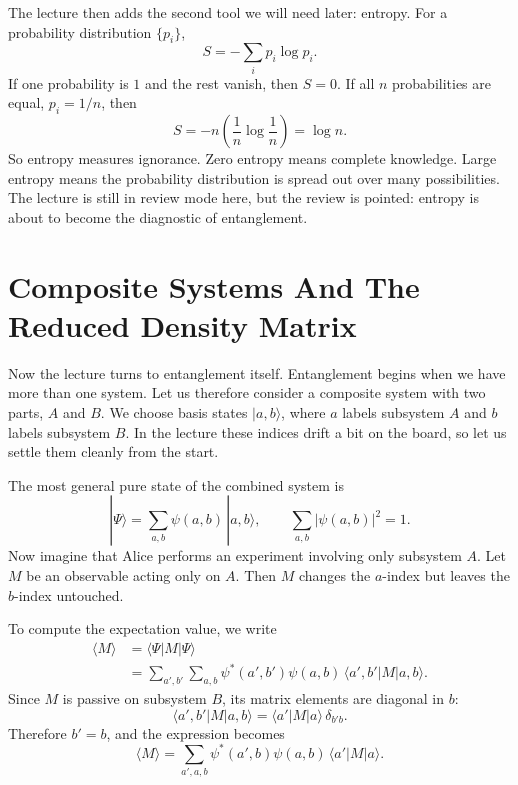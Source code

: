 The lecture then adds the second tool we will need later: entropy. For a probability distribution \(\{p_i\}\),
\begin{equation}
S = -\sum_i p_i \log p_i.
\end{equation}
If one probability is \(1\) and the rest vanish, then \(S=0\). If all \(n\) probabilities are equal, \(p_i = 1/n\), then
\begin{equation}
S = -n\left(\frac{1}{n}\log\frac{1}{n}\right)=\log n.
\end{equation}
So entropy measures ignorance. Zero entropy means complete knowledge. Large entropy means the probability distribution is spread out over many possibilities. The lecture is still in review mode here, but the review is pointed: entropy is about to become the diagnostic of entanglement.

\section{Composite Systems And The Reduced Density Matrix}

Now the lecture turns to entanglement itself. Entanglement begins when we have more than one system. Let us therefore consider a composite system with two parts, \(A\) and \(B\). We choose basis states \(|a,b\rangle\), where \(a\) labels subsystem \(A\) and \(b\) labels subsystem \(B\). In the lecture these indices drift a bit on the board, so let us settle them cleanly from the start.

The most general pure state of the combined system is
\begin{equation}
|\Psi\rangle = \sum_{a,b}\psi(a,b)\,|a,b\rangle,
\qquad
\sum_{a,b}|\psi(a,b)|^2 = 1.
\end{equation}
Now imagine that Alice performs an experiment involving only subsystem \(A\). Let \(M\) be an observable acting only on \(A\). Then \(M\) changes the \(a\)-index but leaves the \(b\)-index untouched.

To compute the expectation value, we write
\begin{align}
\langle M\rangle
&= \langle\Psi|M|\Psi\rangle \\
&=
\sum_{a',b'}\sum_{a,b}
\psi^*(a',b')\psi(a,b)\,
\langle a',b'|M|a,b\rangle.
\end{align}
Since \(M\) is passive on subsystem \(B\), its matrix elements are diagonal in \(b\):
\begin{equation}
\langle a',b'|M|a,b\rangle
=
\langle a'|M|a\rangle\,\delta_{b'b}.
\end{equation}
Therefore \(b'=b\), and the expression becomes
\begin{equation}
\langle M\rangle
=
\sum_{a',a,b}
\psi^*(a',b)\psi(a,b)\,
\langle a'|M|a\rangle.
\end{equation}

